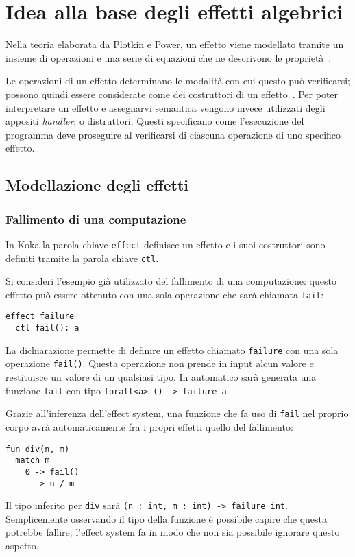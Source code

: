 \section{Idea alla base degli effetti algebrici}

Nella teoria elaborata da Plotkin e Power, un effetto viene modellato tramite un insieme di operazioni e una serie di equazioni che ne descrivono le proprietà~\cite{cit:handling-algebraic-effects,cit:computational-effects-and-operations-an-overview}.

Le operazioni di un effetto determinano le modalità con cui questo può verificarsi; possono quindi essere considerate come dei costruttori di un effetto~\cite{cit:algebraic-operations-and-generic-effects}.
Per poter interpretare un effetto e assegnarvi semantica vengono invece utilizzati degli appositi \emph{handler}, o distruttori. Questi specificano come l'esecuzione del programma deve proseguire al verificarsi di ciascuna operazione di uno specifico effetto.

\subsection{Modellazione degli effetti}
\subsubsection{Fallimento di una computazione}
In Koka la parola chiave \lstinline{effect} definisce un effetto e i suoi costruttori sono definiti tramite la parola chiave \lstinline{ctl}.

Si consideri l'esempio già utilizzato del fallimento di una computazione: questo effetto può essere ottenuto con una sola operazione che sarà chiamata \lstinline{fail}:
\begin{lstlisting}[language=koka]
effect failure
  ctl fail(): a
\end{lstlisting}
La dichiarazione permette di definire un effetto chiamato \lstinline{failure} con una sola operazione \lstinline{fail()}. Questa operazione non prende in input alcun valore e restituisce un valore di un qualsiasi tipo. In automatico sarà generata una funzione \lstinline{fail} con tipo \lstinline{forall<a> () -> failure a}.

Grazie all'inferenza dell'effect system, una funzione che fa uso di \lstinline{fail} nel proprio corpo avrà automaticamente fra i propri effetti quello del fallimento:
\begin{lstlisting}[language=koka]
fun div(n, m)
  match m
    0 -> fail()
    _ -> n / m
\end{lstlisting}
Il tipo inferito per \lstinline{div} sarà \lstinline{(n : int, m : int) -> failure int}. Semplicemente osservando il tipo della funzione è possibile capire che questa potrebbe fallire; l'effect system fa in modo che non sia possibile ignorare questo aspetto.

